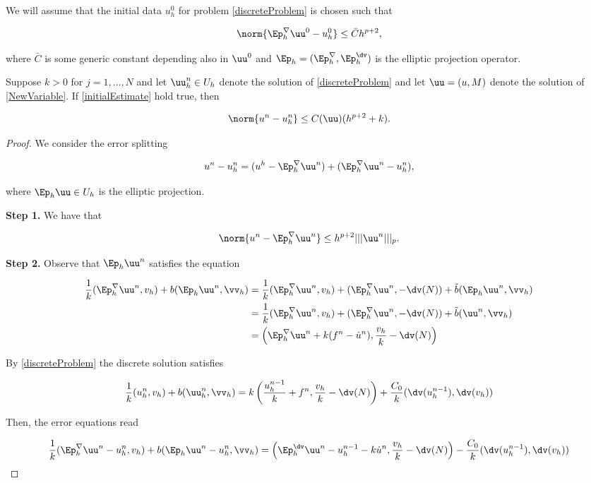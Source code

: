 We will assume that the initial data $u_h^0$ for problem \eqref{discreteProblem} is chosen such that 

\begin{equation}\label{initialEstimate}
    \norm{\Ep_h^{\nabla}\uu^0-u_h^0}\leq \bar{C}h^{p+2},
\end{equation}

where $\bar{C}$ is some generic constant depending also in $\uu^0$ and $\Ep_h=(\Ep_h^{\nabla},\Ep_h^{\dv})$ is the elliptic projection operator.

\begin{teor}
    Suppose $k>0$ for $j=1,\dots, N$ and let $\uu_h^n\in U_h$ denote the solution of \eqref{discreteProblem} and let $\uu=(u,M)$ denote the solution of \eqref{NewVariable}. If \eqref{initialEstimate} hold true, then 

    $$\norm{u^n-u_h^n}\leq C(\uu)(h^{p+2}+k).$$
\end{teor}

\begin{proof}

    We consider the error splitting

    $$u^n-u_h^n=(u^h-\Ep_h^{\nabla}\uu^n)+(\Ep_h^{\nabla}\uu^n-u_h^n),$$

    where $\Ep_h\uu\in U_h$ is the elliptic projection.

    \vspace{0.3 cm}

    \textbf{Step 1.} We have that

    $$\norm{u^n-\Ep_h^{\nabla}\uu^n}\leq h^{p+2}|||\uu^n|||_p.$$

    \vspace{0.3 cm}

    \textbf{Step 2.} Observe that $\Ep_h\uu^n$ satisfies the equation

    \begin{align*}
        \frac{1}{k}(\Ep_h^{\nabla}\uu^n,v_h)+b(\Ep_h\uu^n,\vv_h)&=\frac{1}{k}(\Ep_h^{\nabla}\uu^n,v_h)+(\Ep_h^{\nabla}\uu^n,-\dv(N))+\tilde{b}(\Ep_h\uu^n,\vv_h)\\
        &=\frac{1}{k}(\Ep_h^{\nabla}\uu^n,v_h)+(\Ep_h^{\nabla}\uu^n,-\dv(N))+\tilde{b}(\uu^n,\vv_h)\\
        &=\left(\Ep_h^{\nabla}\uu^n+k(f^n-\dot{u}^n),\frac{v_h}{k}-\dv(N)\right)
    \end{align*}

    By \eqref{discreteProblem} the discrete solution satisfies

    $$\frac{1}{k}(u_h^n,v_h)+b(\uu_h^n,\vv_h)=k\left(\frac{u_h^{n-1}}{k}+f^n,\frac{v_h}{k}-\dv(N)\right)+\frac{C_0}{k}(\dv(u_h^{n-1}),\dv(v_h))$$

    Then, the error equations read

    $$\frac{1}{k}(\Ep_h^{\nabla}\uu^n-u_h^n,v_h)+b(\Ep_h\uu^n-u_h^n,\vv_h)=\left(\Ep_h^{\dv}\uu^n-u_h^{n-1}-k\dot{u}^n,\frac{v_h}{k}-\dv(N)\right)-\frac{C_0}{k}(\dv(u_h^{n-1}),\dv(v_h))$$
\end{proof}